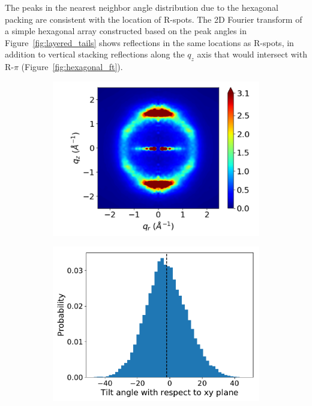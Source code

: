\documentclass[journal=jpcbfk,manuscript=article]{achemso}
\begin{document}
  The peaks in the nearest neighbor angle distribution due to the hexagonal
  packing are consistent with the location of R-spots. The 2D Fourier transform
  of a simple hexagonal array constructed based on the peak angles in
  Figure~\ref{fig:layered_tails} shows reflections in the same locations as
  R-spots, in addition to vertical stacking reflections along the $q_z$ axis that
  would intersect with R-$\pi$ (Figure~\ref{fig:hexagonal_ft}). 

  \begin{figure}[!htb]
  \begin{subfigure}{0.32\linewidth}
  	\centering
  	\includegraphics[width=\textwidth]{rzplot_layered_280K_jet.pdf}
  	\caption{}\label{fig:sandwiched280K}
  \end{subfigure}
  \begin{subfigure}{0.32\linewidth}
    \includegraphics[width=\textwidth]{tilt_dist.pdf}

\end{subfigure}
\end{figure}
\end{document}
